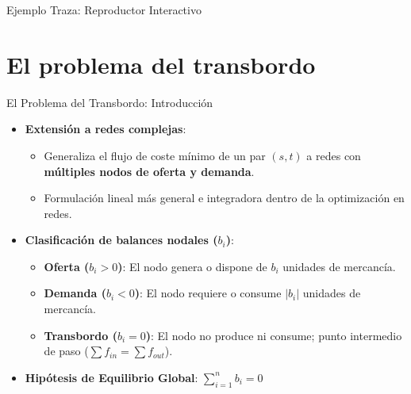 \documentclass[
  ignorenonframetext,
]{beamer}
\providecommand{\tightlist}{%
  \setlength{\itemsep}{0pt}\setlength{\parskip}{0pt}}
\begin{document}
\begin{frame}{Ejemplo Traza: Reproductor Interactivo}
\label{ejemplo-traza-reproductor-interactivo}
\end{frame}

\section{El problema del transbordo}\label{el-problema-del-transbordo}

\begin{frame}{El Problema del Transbordo: Introducción}
\label{el-problema-del-transbordo-introducciuxf3n}
\begin{itemize}
\tightlist
\item
  \textbf{Extensión a redes complejas}:

  \begin{itemize}
  \tightlist
  \item
    Generaliza el flujo de coste mínimo de un par \((s, t)\) a redes con
    \textbf{múltiples nodos de oferta y demanda}.
  \item
    Formulación lineal más general e integradora dentro de la
    optimización en redes.
  \end{itemize}
\item
  \textbf{Clasificación de balances nodales (\(b_i\))}:

  \begin{itemize}
  \tightlist
  \item
    \textbf{Oferta (\(b_i > 0\))}: El nodo genera o dispone de \(b_i\)
    unidades de mercancía.
  \item
    \textbf{Demanda (\(b_i < 0\))}: El nodo requiere o consume \(|b_i|\)
    unidades de mercancía.
  \item
    \textbf{Transbordo (\(b_i = 0\))}: El nodo no produce ni consume;
    punto intermedio de paso (\(\sum f_{in} = \sum f_{out}\)).
  \end{itemize}
\item
  \textbf{Hipótesis de Equilibrio Global}: \(\sum_{i=1}^n b_i = 0\)
\end{itemize}
\end{frame}
\end{document}
